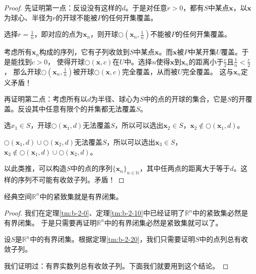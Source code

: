 \documentclass[12pt,UTF8]{ctexbook}
\begin{document}
\begin{appendix}
\begin{proof}
    先证明第一点：反设没有这样的$d$。于是对任意$r>0$，都有$S$中某点$\mathbf{x}$，以$\mathbf{x}$为球心、半径为$r$的开球不能被$P$的任何开集覆盖。

    选择$r = \frac{1}{n}$，即对应的点为$\mathbf{x}_n$，则开球$\bigcirc\left(\mathbf{x}_n,\frac{1}{n}\right)$不能被$P$的任何开集覆盖。

    考虑所有$\mathbf{x}_n$构成的序列，它有子列收敛到$S$中某点$\mathbf{x}$。而$\mathbf{x}$被$P$中某开集$U$覆盖。于是能找到$c>0$，
    使得开球$\bigcirc(\mathbf{x},c)$在$U$中。选择$n$使得$\mathbf{x}$到$\mathbf{x}_n$的距离小于$\frac{c}{2}$且$\frac{1}{n} < \frac{c}{2}$，
    那么开球$\bigcirc\left(\mathbf{x}_n,\frac{1}{n}\right)$被开球$\bigcirc(\mathbf{x},c)$完全覆盖，从而被$U$完全覆盖。
    这与$\mathbf{x}_n$定义矛盾！

    再证明第二点：考虑所有以$d$为半径、球心为$S$中的点的开球的集合，它是$S$的开覆盖。反设其中任意有限个的并集都无法覆盖$S$。

    选$x_1\in S$，开球$\bigcirc(\mathbf{x}_1,d)$无法覆盖$S$，所以可以选出$\mathbf{x}_2\in S$，$\mathbf{x}_2\notin \bigcirc(\mathbf{x}_1,d)$。

    $\bigcirc(\mathbf{x}_1,d)\cup \bigcirc(\mathbf{x}_2,d)$无法覆盖$S$，所以可以选出$\mathbf{x}_3\in S$，$\mathbf{x}_3\notin \bigcirc(\mathbf{x}_1,d)\cup \bigcirc(\mathbf{x}_2,d)$。

    以此类推，可以构造$S$中的点的序列$\{\mathbf{x}_n\}_{n\in\mathbb{N}}$，其中任两点的距离大于等于$d$。这样的序列不可能有收敛子列。矛盾！

\end{proof}

\begin{tm}
    经典空间$\mathbb{R}^n$中的紧致集就是有界闭集。
\end{tm}

\begin{proof}
    我们在定理\ref{tm:b-2-0}、定理\ref{tm:b-2-10}中已经证明了$\mathbb{R}^n$中的紧致集必然是有界闭集。
    于是只需要再证明$\mathbb{R}^n$中的有界闭集必然是紧致集就可以了。

    设$S$是$\mathbb{R}^n$中的有界闭集。根据定理\ref{tm:b-2-20}，我们只需要证明$S$中的点列总有收敛子列。

    我们证明过：有界实数列总有收敛子列。下面我们就要用到这个结论。


\end{proof}
\end{appendix}
\end{document}
